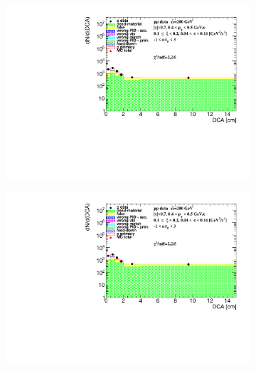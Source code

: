 \begin{figure}[h!]
\begin{subfigure}{.45\textwidth}
	\end{subfigure}
	\begin{subfigure}{.45\textwidth}
		\includegraphics[width=\linewidth, page=8]{chapters/chrgSTAR/img/DCAproton/background_p_2.pdf}
	\end{subfigure}
	\begin{subfigure}{.45\textwidth}
		\includegraphics[width=\linewidth, page=11]{chapters/chrgSTAR/img/DCAproton/background_p_2.pdf}
	\end{subfigure}
	\begin{subfigure}{.45\textwidth}

\end{subfigure}
\end{figure}
